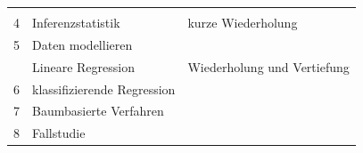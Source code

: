 \documentclass[12pt,]{book}
\begin{document}
\begin{longtable}[]{@{}lll@{}}
\begin{minipage}[t]{0.32\columnwidth}
\strut
\end{minipage}\tabularnewline
4 & Inferenzstatistik & kurze Wiederholung\tabularnewline
\begin{minipage}[t]{0.32\columnwidth}\raggedright\strut
5\strut
\end{minipage} & \begin{minipage}[t]{0.32\columnwidth}\raggedright\strut
Daten modellieren\strut
\end{minipage} & \begin{minipage}[t]{0.32\columnwidth}\raggedright\strut
\strut
\end{minipage}\tabularnewline
\begin{minipage}[t]{0.32\columnwidth}\raggedright\strut
\strut
\end{minipage} & \begin{minipage}[t]{0.32\columnwidth}\raggedright\strut
Lineare Regression\strut
\end{minipage} & \begin{minipage}[t]{0.32\columnwidth}\raggedright\strut
Wiederholung und Vertiefung\strut
\end{minipage}\tabularnewline
\begin{minipage}[t]{0.32\columnwidth}\raggedright\strut
6\strut
\end{minipage} & \begin{minipage}[t]{0.32\columnwidth}\raggedright\strut
klassifizierende Regression\strut
\end{minipage} & \begin{minipage}[t]{0.32\columnwidth}\raggedright\strut
\strut
\end{minipage}\tabularnewline
\begin{minipage}[t]{0.32\columnwidth}\raggedright\strut
7\strut
\end{minipage} & \begin{minipage}[t]{0.32\columnwidth}\raggedright\strut
Baumbasierte Verfahren\strut
\end{minipage} & \begin{minipage}[t]{0.32\columnwidth}\raggedright\strut
\strut
\end{minipage}\tabularnewline
\begin{minipage}[t]{0.32\columnwidth}\raggedright\strut
8\strut
\end{minipage} & \begin{minipage}[t]{0.32\columnwidth}\raggedright\strut
Fallstudie\strut
\end{minipage} & \begin{minipage}[t]{0.32\columnwidth}\raggedright\strut

\end{minipage}
\end{longtable}
\end{document}
